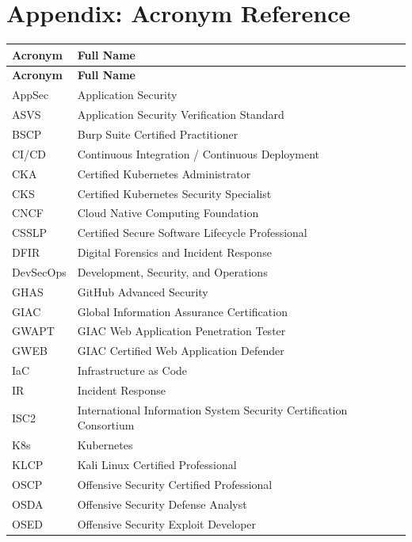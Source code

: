 \documentclass[11pt,letterpaper]{article}
\begin{document}
\newpage

\appendix
\section{Appendix: Acronym Reference}

\begin{longtable}{l l}
\toprule
\textbf{Acronym} & \textbf{Full Name} \\
\midrule
\endfirsthead
\toprule
\textbf{Acronym} & \textbf{Full Name} \\
\midrule
\endhead
\bottomrule
\endlastfoot
AppSec & Application Security \\
ASVS & Application Security Verification Standard \\
BSCP & Burp Suite Certified Practitioner \\
CI/CD & Continuous Integration / Continuous Deployment \\
CKA & Certified Kubernetes Administrator \\
CKS & Certified Kubernetes Security Specialist \\
CNCF & Cloud Native Computing Foundation \\
CSSLP & Certified Secure Software Lifecycle Professional \\
DFIR & Digital Forensics and Incident Response \\
DevSecOps & Development, Security, and Operations \\
GHAS & GitHub Advanced Security \\
GIAC & Global Information Assurance Certification \\
GWAPT & GIAC Web Application Penetration Tester \\
GWEB & GIAC Certified Web Application Defender \\
IaC & Infrastructure as Code \\
IR & Incident Response \\
ISC2 & International Information System Security Certification Consortium \\
K8s & Kubernetes \\
KLCP & Kali Linux Certified Professional \\
OSCP & Offensive Security Certified Professional \\
OSDA & Offensive Security Defense Analyst \\
OSED & Offensive Security Exploit Developer \\

\end{longtable}
\end{document}
